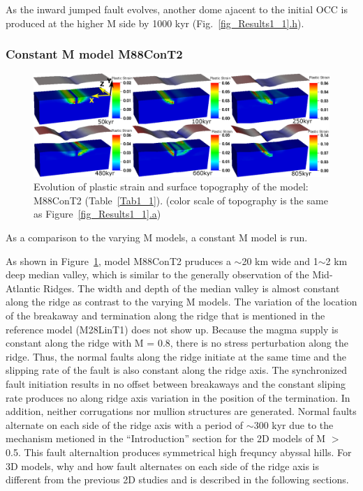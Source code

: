 As the inward jumped fault evolves, another dome ajacent to the initial OCC is produced at the higher M side by 1000 kyr (Fig.~\hyperref[fig_Results1_1]{\ref{fig_Results1_1}.h}).  

\subsubsection{Constant M model M88ConT2} 
\begin{figure}[h]
  \centering
    \includegraphics[width=1.0\textwidth]{./Figures/fig_Results1_3.eps}
  \caption{Evolution of plastic strain and surface topography of the model: M88ConT2 (Table~\hyperref[Tab1_1]{\ref{Tab1_1}}). (color scale of topography is the same as Figure~\hyperref[fig_Results1_1]{\ref{fig_Results1_1}.a})}
 \label{fig_Results1_3}
\end{figure}   

As a comparison to the varying M models, a constant M model is run. 

As shown in Figure~\hyperref[fig_Results1_3]{\ref{fig_Results1_3}}, model M88ConT2 pruduces a $\sim$20 km wide and 1$\sim$2 km deep median valley, which is similar to the generally observation of the Mid-Atlantic Ridges. The width and depth of the median valley is almost constant along the ridge as contrast to the varying M models. The variation of the location of the breakaway and termination along the ridge that is mentioned in the reference model (M28LinT1) does not show up. Because the magma supply is constant along the ridge with M = 0.8, there is no stress perturbation along the ridge. Thus, the normal faults along the ridge initiate at the same time and the slipping rate of the fault is also constant along the ridge axis. The synchronized fault initiation results in no offset between breakaways and the constant sliping rate produces no along ridge axis variation in the position of the termination. In addition, neither corrugations nor mullion structures are generated. Normal faults alternate on each side of the ridge axis with a period of $\sim$300 kyr due to the mechanism metioned in the ``Introduction'' section for the 2D models of M $>$ 0.5. This fault alternaltion produces symmetrical high frequncy abyssal hills. For 3D models, why and how fault alternates on each side of the ridge axis is different from the previous 2D studies and is described in the following sections. 

